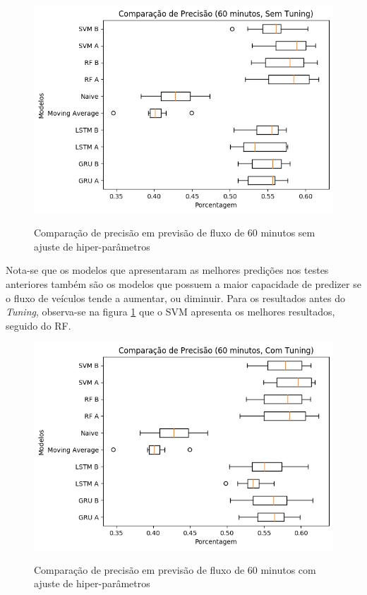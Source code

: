 \begin{figure}[H]
    \centering
    \includegraphics[scale=0.8]{monography/img/snapshots/comparacao_de_precisao_(60_minutos,_sem_tuning)_performance_boxes.png}
    \label{figure:comparacao_previsao_precisao_60_sem_tuning_r}
    \caption{Comparação de precisão em previsão de fluxo de 60 minutos sem ajuste de hiper-parâmetros}
\end{figure}

Nota-se que os modelos que apresentaram as melhores predições nos testes anteriores também são os modelos que possuem a maior capacidade de predizer se o fluxo de veículos tende a aumentar, ou diminuir. Para os resultados antes do \textit{Tuning}, observa-se na figura \ref{figure:comparacao_previsao_precisao_60_sem_tuning_r} que o \acrshort{SVM} apresenta os melhores resultados, seguido do \acrshort{RF}.

\begin{figure}[H]
    \centering
    \includegraphics[scale=0.8]{monography/img/snapshots/comparacao_de_precisao_(60_minutos,_com_tuning)_performance_boxes.png}
    \label{figure:comparacao_previsao_precisao_60_com_tuning_r}
    \caption{Comparação de precisão em previsão de fluxo de 60 minutos com ajuste de hiper-parâmetros}
\end{figure}

